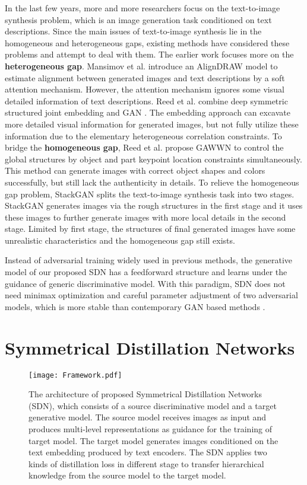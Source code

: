 \documentclass[sigconf]{acmart}
\begin{document}
In the last few years, more and more researchers focus on the text-to-image synthesis problem, which is an image generation task conditioned on text descriptions. Since the main issues of text-to-image synthesis lie in the homogeneous and heterogeneous gaps, existing methods have considered these problems and attempt to deal with them. The earlier work focuses more on the \textbf{heterogeneous gap}.
Mansimov et al. \cite{mansimov2015generating} introduce an AlignDRAW model to estimate alignment between generated images and text descriptions by a soft attention mechanism. However, the attention mechanism ignores some visual detailed information of text descriptions.
Reed et al. \cite{reed2016generative} combine deep symmetric structured joint embedding \cite{reed2016learning} and GAN \cite{goodfellow2014generative}. The embedding approach can excavate more detailed visual information for generated images, but not fully utilize these information due to the elementary heterogeneous correlation constraints. 
To bridge the \textbf{homogeneous gap}, Reed et al. \cite{reed2016gawwn} propose GAWWN to control the global structures by object and part keypoint location constraints simultaneously. This method can generate images with correct object shapes and colors successfully, but still lack the authenticity in details. To relieve the homogeneous gap problem, StackGAN \cite{zhang2016stackgan} splits the text-to-image synthesis task into two stages. StackGAN generates images via the rough structures in the first stage and it uses these images to further generate images with more local details in the second stage. Limited by first stage, the structures of final generated images have some unrealistic characteristics and the homogeneous gap still exists.

Instead of adversarial training widely used in previous methods, the generative model of our proposed SDN has a feedforward structure and learns under the guidance of generic discriminative model. With this paradigm, SDN does not need minimax optimization and careful parameter adjustment of two adversarial models, which is more stable than contemporary GAN based methods \cite{arjovsky2017towards}. 


\section{Symmetrical Distillation Networks}

\begin{figure*}
	\begin{center}
		\texttt{[image: Framework.pdf]}
	\end{center}
	\caption{The architecture of proposed Symmetrical Distillation Networks (SDN), which consists of a source discriminative model and a target generative model. The source model receives images as input and produces multi-level representations as guidance for the training of target model. The target model generates images conditioned on the text embedding produced by text encoders. The SDN applies two kinds of distillation loss in different stage to transfer hierarchical knowledge from the source model to the target model.}
	\label{fig:framework}
\end{figure*}
\end{document}
